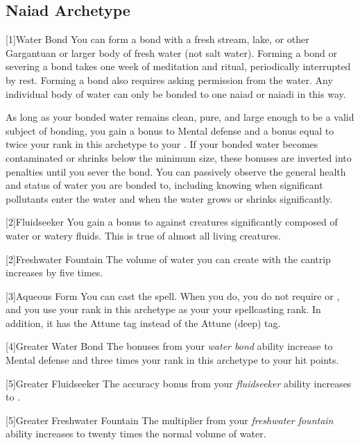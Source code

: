 \subsection{Naiad Archetype}

[1]{Water Bond} You can form a bond with a fresh stream, lake, or other Gargantuan or larger body of fresh water (not salt water).
Forming a bond or severing a bond takes one week of meditation and ritual, periodically interrupted by rest.
Forming a bond also requires asking permission from the water.
Any individual body of water can only be bonded to one naiad or naiadi in this way.

As long as your bonded water remains clean, pure, and large enough to be a valid subject of bonding, you gain a  bonus to Mental defense and a bonus equal to twice your rank in this archetype to your .
If your bonded water becomes contaminated or shrinks below the minimum size, these bonuses are inverted into penalties until you sever the bond.
You can passively observe the general health and status of water you are bonded to, including knowing when significant pollutants enter the water and when the water grows or shrinks significantly.

[2]{Fluidseeker} You gain a  bonus to  against creatures significantly composed of water or watery fluids.
This is true of almost all living creatures.

[2]{Freshwater Fountain} The volume of water you can create with the  cantrip increases by five times.

[3]{Aqueous Form} You can cast the  spell.
When you do, you do not require  or , and you use your rank in this archetype as your your spellcasting rank.
In addition, it has the Attune tag instead of the Attune (deep) tag.

[4]{Greater Water Bond} The bonuses from your \textit{water bond} ability increase to  Mental defense and three times your rank in this archetype to your hit points.

[5]{Greater Fluidseeker} The accuracy bonus from your \textit{fluidseeker} ability increases to .

[5]{Greater Freshwater Fountain} The multiplier from your \textit{freshwater fountain} ability increases to twenty times the normal volume of water.

